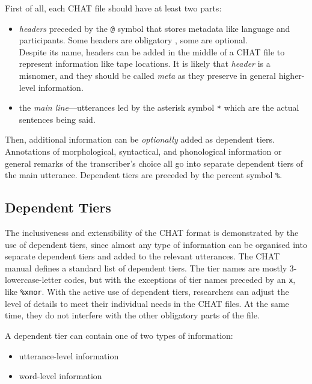 First of all, each CHAT file should have at least two parts:
\begin{itemize}
    \item \emph{headers} preceded by the \texttt{@} symbol that stores metadata like language and participants. Some headers are obligatory , some are optional.\\
    Despite its name, headers can be added in the middle of a CHAT file to represent information like tape locations. It is likely that \emph{header} is a misnomer, and they should be called \emph{meta} as they preserve in general higher-level information.
    \item the \emph{main line}---utterances led by the asterisk symbol \texttt{*} which are the actual sentences being said.\\
\end{itemize}

Then, additional information can be \emph{optionally} added as dependent tiers. Annotations of morphological, syntactical, and phonological information or general remarks of the transcriber's choice all go into separate dependent tiers of the main utterance. Dependent tiers are preceded by the percent symbol \texttt{\%}.

\subsection{Dependent Tiers}
The inclusiveness and extensibility of the CHAT format is demonstrated by the use of dependent tiers, since almost any type of information can be organised into separate dependent tiers and added to the relevant utterances. The CHAT manual defines a standard list of dependent tiers. The tier names are mostly 3-lowercase-letter codes, but with the exceptions of tier names preceded by an \texttt{x}, like \texttt{\%xmor}. With the active use of dependent tiers, researchers can adjust the level of details to meet their individual needs in the CHAT files. At the same time, they do not interfere with the other obligatory parts of the file.

A dependent tier can contain one of two types of information:
\begin{itemize}
    \item utterance-level information
    \item word-level information
\end{itemize}

